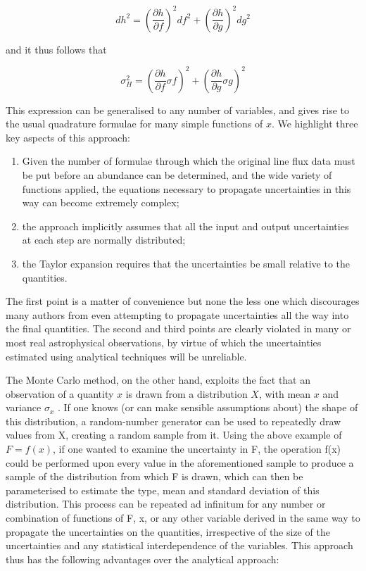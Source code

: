 \documentclass[useAMS,usenatbib]{mn2e}
\begin{document}
\begin{equation}
dh^2 = \left(\frac{\partial h}{\partial f}\right)^2df^2 + \left(\frac{\partial h}{\partial g}\right)^2dg^2
\end{equation}

and it thus follows that

\begin{equation}
\sigma^2_H = \left(\frac{\partial h}{\partial f}\sigma f\right)^2 + \left(\frac{\partial h}{\partial g}\sigma g\right)^2
\end{equation}

This expression can be generalised to any number of variables, and gives rise to the usual quadrature formulae for many simple functions of $x$.  We highlight three key aspects of this approach:

\begin{enumerate}
  \item Given the number of formulae through which the original line flux data must be put before an abundance can be determined, and the wide variety of functions applied, the equations necessary to propagate uncertainties in this way can become extremely complex;
  \item the approach implicitly assumes that all the input and output uncertainties at each step are normally distributed;
  \item the Taylor expansion requires that the uncertainties be small relative to the quantities.
\end{enumerate}

The first point is a matter of convenience but none the less one which discourages many authors from even attempting to propagate uncertainties all the way into the final quantities.  The second and third points are clearly violated in many or most real astrophysical observations, by virtue of which the uncertainties estimated using analytical techniques will be unreliable.

The Monte Carlo method, on the other hand, exploits the fact that an observation of a quantity $x$ is drawn from a distribution $X$, with mean $x$ and variance $\sigma_x$ . If one knows (or can make sensible assumptions about) the shape of this distribution, a random-number generator can be used to repeatedly draw values from X, creating a random sample from it. Using the above example of $F = f (x)$, if one wanted to examine the uncertainty in F, the operation f(x) could be performed upon every value in the aforementioned sample to produce a sample of the distribution from which F is drawn, which can then be parameterised to estimate the type, mean and standard deviation of this distribution. This process can be repeated ad infinitum for any number or combination of functions of F, x, or any other variable derived in the same way to propagate the uncertainties on the quantities, irrespective of the size of the uncertainties and any statistical interdependence of the variables.  This approach thus has the following advantages over the analytical approach:
\end{document}
